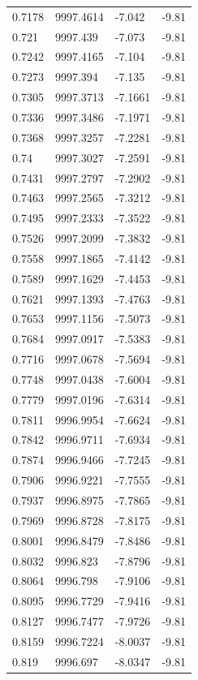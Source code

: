 \begin{table}[H]
\begin{tabular}{llll}
0.7178 & 9997.4614 & -7.042 & -9.81 \\
0.721 & 9997.439 & -7.073 & -9.81 \\
0.7242 & 9997.4165 & -7.104 & -9.81 \\
0.7273 & 9997.394 & -7.135 & -9.81 \\
0.7305 & 9997.3713 & -7.1661 & -9.81 \\
0.7336 & 9997.3486 & -7.1971 & -9.81 \\
0.7368 & 9997.3257 & -7.2281 & -9.81 \\
0.74 & 9997.3027 & -7.2591 & -9.81 \\
0.7431 & 9997.2797 & -7.2902 & -9.81 \\
0.7463 & 9997.2565 & -7.3212 & -9.81 \\
0.7495 & 9997.2333 & -7.3522 & -9.81 \\
0.7526 & 9997.2099 & -7.3832 & -9.81 \\
0.7558 & 9997.1865 & -7.4142 & -9.81 \\
0.7589 & 9997.1629 & -7.4453 & -9.81 \\
0.7621 & 9997.1393 & -7.4763 & -9.81 \\
0.7653 & 9997.1156 & -7.5073 & -9.81 \\
0.7684 & 9997.0917 & -7.5383 & -9.81 \\
0.7716 & 9997.0678 & -7.5694 & -9.81 \\
0.7748 & 9997.0438 & -7.6004 & -9.81 \\
0.7779 & 9997.0196 & -7.6314 & -9.81 \\
0.7811 & 9996.9954 & -7.6624 & -9.81 \\
0.7842 & 9996.9711 & -7.6934 & -9.81 \\
0.7874 & 9996.9466 & -7.7245 & -9.81 \\
0.7906 & 9996.9221 & -7.7555 & -9.81 \\
0.7937 & 9996.8975 & -7.7865 & -9.81 \\
0.7969 & 9996.8728 & -7.8175 & -9.81 \\
0.8001 & 9996.8479 & -7.8486 & -9.81 \\
0.8032 & 9996.823 & -7.8796 & -9.81 \\
0.8064 & 9996.798 & -7.9106 & -9.81 \\
0.8095 & 9996.7729 & -7.9416 & -9.81 \\
0.8127 & 9996.7477 & -7.9726 & -9.81 \\
0.8159 & 9996.7224 & -8.0037 & -9.81 \\
0.819 & 9996.697 & -8.0347 & -9.81 \\

\end{tabular}
\end{table}
